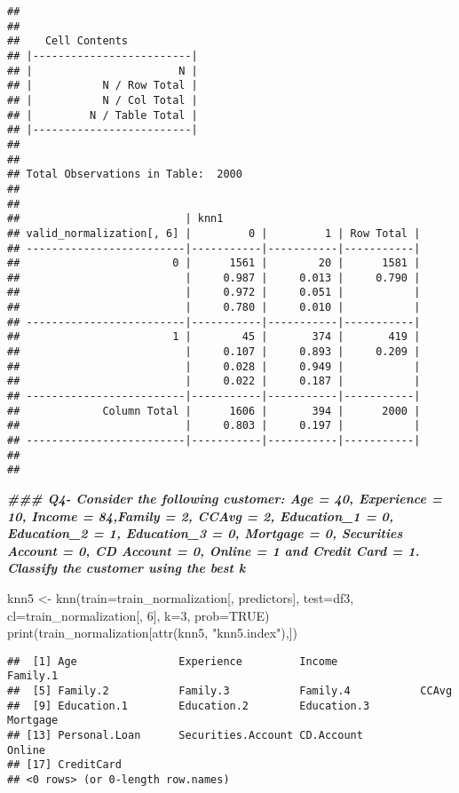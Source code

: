 \documentclass[
]{article}
\newenvironment{Shaded}{\begin{snugshade}}{\end{snugshade}}
\newcommand{\AttributeTok}[1]{\textcolor[rgb]{0.77,0.63,0.00}{#1}}
\newcommand{\ConstantTok}[1]{\textcolor[rgb]{0.00,0.00,0.00}{#1}}
\newcommand{\DecValTok}[1]{\textcolor[rgb]{0.00,0.00,0.81}{#1}}
\newcommand{\DocumentationTok}[1]{\textcolor[rgb]{0.56,0.35,0.01}{\textbf{\textit{#1}}}}
\newcommand{\FunctionTok}[1]{\textcolor[rgb]{0.00,0.00,0.00}{#1}}
\newcommand{\NormalTok}[1]{#1}
\newcommand{\OtherTok}[1]{\textcolor[rgb]{0.56,0.35,0.01}{#1}}
\newcommand{\StringTok}[1]{\textcolor[rgb]{0.31,0.60,0.02}{#1}}
\begin{document}
\begin{verbatim}
## 
##  
##    Cell Contents
## |-------------------------|
## |                       N |
## |           N / Row Total |
## |           N / Col Total |
## |         N / Table Total |
## |-------------------------|
## 
##  
## Total Observations in Table:  2000 
## 
##  
##                          | knn1 
## valid_normalization[, 6] |         0 |         1 | Row Total | 
## -------------------------|-----------|-----------|-----------|
##                        0 |      1561 |        20 |      1581 | 
##                          |     0.987 |     0.013 |     0.790 | 
##                          |     0.972 |     0.051 |           | 
##                          |     0.780 |     0.010 |           | 
## -------------------------|-----------|-----------|-----------|
##                        1 |        45 |       374 |       419 | 
##                          |     0.107 |     0.893 |     0.209 | 
##                          |     0.028 |     0.949 |           | 
##                          |     0.022 |     0.187 |           | 
## -------------------------|-----------|-----------|-----------|
##             Column Total |      1606 |       394 |      2000 | 
##                          |     0.803 |     0.197 |           | 
## -------------------------|-----------|-----------|-----------|
## 
## 
\end{verbatim}

\begin{Shaded}
\begin{Highlighting}[]
\DocumentationTok{\#\#\# Q4{-} Consider the following customer: Age = 40, Experience = 10, Income = 84,Family = 2, CCAvg = 2, Education\_1 = 0, Education\_2 = 1, Education\_3 = 0, Mortgage = 0, Securities Account = 0, CD Account = 0, Online = 1 and Credit Card = 1. Classify the customer using the best k}

\NormalTok{knn5 }\OtherTok{\textless{}{-}} \FunctionTok{knn}\NormalTok{(}\AttributeTok{train=}\NormalTok{train\_normalization[, predictors], }\AttributeTok{test=}\NormalTok{df3, }\AttributeTok{cl=}\NormalTok{train\_normalization[, }\DecValTok{6}\NormalTok{], }\AttributeTok{k=}\DecValTok{3}\NormalTok{, }\AttributeTok{prob=}\ConstantTok{TRUE}\NormalTok{)}
\FunctionTok{print}\NormalTok{(train\_normalization[}\FunctionTok{attr}\NormalTok{(knn5, }\StringTok{"knn5.index"}\NormalTok{),]) }
\end{Highlighting}
\end{Shaded}

\begin{verbatim}
##  [1] Age                Experience         Income             Family.1          
##  [5] Family.2           Family.3           Family.4           CCAvg             
##  [9] Education.1        Education.2        Education.3        Mortgage          
## [13] Personal.Loan      Securities.Account CD.Account         Online            
## [17] CreditCard        
## <0 rows> (or 0-length row.names)
\end{verbatim}
\end{document}
